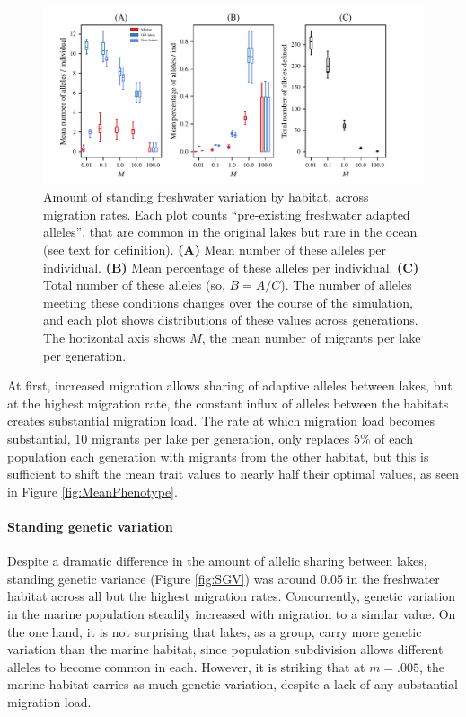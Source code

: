 \documentclass{article}
\newcommand{\plr}[1]{\todo[linecolor=blue,backgroundcolor=blue!25,bordercolor=blue]{#1}}
\begin{document}
\begin{figure}
	\begin{center}
  		\includegraphics{Final_Plots/Freshwater_Alleles.pdf}
  		\caption{
            Amount of standing freshwater variation by habitat, across migration rates.
            Each plot counts ``pre-existing freshwater adapted alleles'',
            that are common in the original lakes but rare in the ocean
            (see text for definition).
            \textbf{(A)} Mean number of these alleles per individual.
            \textbf{(B)} Mean percentage of these alleles per individual.
            \textbf{(C)} Total number of these alleles (so, $B = A/C$).
            The number of alleles meeting these conditions changes over the course of the simulation,
            and each plot shows distributions of these values across generations.
            The horizontal axis shows $M$, the mean number of migrants per lake per generation.
		}
		\label{fig:MPFAI}
	\end{center}
\end{figure}


At first, increased migration allows sharing of adaptive alleles between lakes, 
but at the highest migration rate, 
the constant influx of alleles between the habitats creates substantial migration load. 
The rate at which migration load becomes substantial,
10 migrants per lake per generation,
only replaces 5\% of each population each generation with migrants from the other habitat, 
but this is sufficient to shift the mean trait values to nearly half their optimal values, 
as seen in Figure \ref{fig:MeanPhenotype}. 

\paragraph{Standing genetic variation} 
Despite a dramatic difference in the amount of allelic sharing between lakes, 
standing genetic variance (Figure \ref{fig:SGV}) 
was around 0.05 in the freshwater habitat across all but the highest migration rates. 
Concurrently, genetic variation in the marine population 
steadily increased with migration to a similar value. 
On the one hand, it is not surprising that lakes, as a group, 
carry more genetic variation than the marine habitat, 
since population subdivision allows different alleles to become common in each. 
However, it is striking that at $m=.005$, 
the marine habitat carries as much genetic variation, 
despite a lack of any substantial migration load.
\plr{perhaps we want to remove this bit?}
\end{document}

